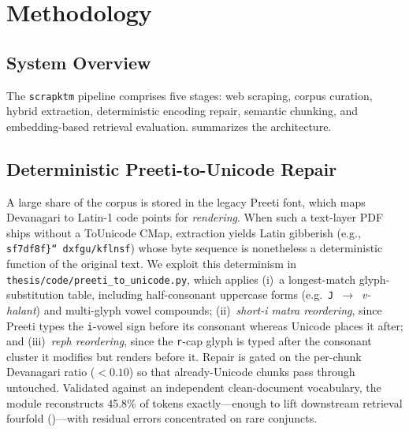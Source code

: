 \chapter{Methodology}
\label{ch:methodology}

\section{System Overview}
The \texttt{scrapktm} pipeline comprises five stages: web scraping, corpus curation, hybrid extraction, deterministic encoding repair, semantic chunking, and embedding-based retrieval evaluation.  summarizes the architecture.

\section{Deterministic Preeti-to-Unicode Repair}
\label{sec:repair-impl}
A large share of the corpus is stored in the legacy Preeti font, which maps Devanagari to Latin-1 code points for \emph{rendering}. When such a text-layer PDF ships without a ToUnicode CMap, extraction yields Latin gibberish (e.g., \texttt{sf7df8f\}“ dxfgu/kflnsf}) whose byte sequence is nonetheless a deterministic function of the original text. We exploit this determinism in \texttt{thesis/code/preeti\_to\_unicode.py}, which applies (i)~a longest-match glyph-substitution table, including half-consonant uppercase forms (e.g.\ \texttt{J}~$\rightarrow$~\emph{v-halant}) and multi-glyph vowel compounds; (ii)~\emph{short-i matra reordering}, since Preeti types the \texttt{i}-vowel sign before its consonant whereas Unicode places it after; and (iii)~\emph{reph reordering}, since the \texttt{r}-cap glyph is typed after the consonant cluster it modifies but renders before it. Repair is gated on the per-chunk Devanagari ratio ($<0.10$) so that already-Unicode chunks pass through untouched. Validated against an independent clean-document vocabulary, the module reconstructs 45.8\% of tokens exactly---enough to lift downstream retrieval fourfold ()---with residual errors concentrated on rare conjuncts.

